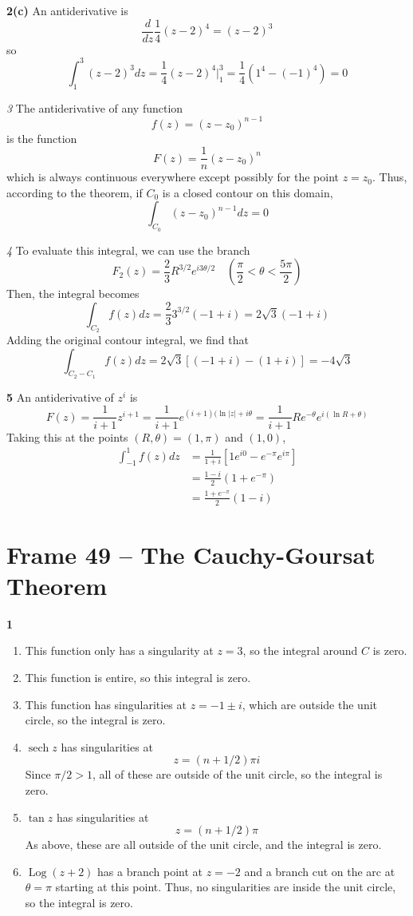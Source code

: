 \documentclass{article}
\DeclareMathOperator{\Log}{Log}
\DeclareMathOperator{\sech}{sech}
\begin{document}
\textbf{2(c)}
An antiderivative is
\[
	\frac{d}{dz} \frac{1}{4} (z - 2)^4 = (z - 2)^3
\]
so
\[
	\int_1^3 (z - 2)^3 dz 
	= \frac{1}{4} (z - 2)^4 \Big|_1^3
	= \frac{1}{4} (1^4 - (-1)^4)
	= 0
\]

\textit{3}
The antiderivative of any function
\[
	f(z) = (z - z_0)^{n-1}
\]
is the function
\[
	F(z) = \frac{1}{n} (z - z_0)^{n}
\]
which is always continuous everywhere except possibly for the point $z = z_0$. Thus, according to the theorem, if $C_0$ is a closed contour on this domain,
\[
	\int_{C_0} (z - z_0)^{n-1} dz = 0
\]

\textit{4} 
To evaluate this integral, we can use the branch
\[
	F_2(z) = \frac{2}{3} R^{3/2} e^{i3\theta/2} \quad
	\left( \frac{\pi}{2} < \theta < \frac{5\pi}{2} \right)
\]
Then, the integral becomes
\[
	\int_{C_2} f(z) dz
	= \frac{2}{3} 3^{3/2} (-1 + i)
	= 2\sqrt{3} (-1 + i)
\]
Adding the original contour integral, we find that
\[
	\int_{C_2 - C_1} f(z) dz
	= 2\sqrt{3} [(-1 + i) - (1 + i)]
	= -4\sqrt{3} 
\]

\textbf{5}
An antiderivative of $z^i$ is
\[
	F(z) = \frac{1}{i+1} z^{i+1} 
	= \frac{1}{i+1} e^{(i+1)(\ln |z| + i\theta}
	= \frac{1}{i+1} Re^{-\theta} e^{i (\ln R + \theta)} 
\]
Taking this at the points $(R, \theta) = (1, \pi)$ and $(1, 0)$,
\begin{align*}
	\int_{-1}^{1} f(z) dz
	&= \frac{1}{1+i} \left[ 1e^{i0} - e^{-\pi}e^{i\pi} \right] \\
	&= \frac{1-i}{2} (1 + e^{-\pi}) \\
	&= \frac{1 + e^{-\pi}}{2} (1 - i)
\end{align*}


\clearpage
\section{Frame 49 -- The Cauchy-Goursat Theorem}
\textbf{1}
\begin{enumerate}
	\item This function only has a singularity at $z = 3$, so the integral around $C$ is zero.
	
	\item This function is entire, so this integral is zero.
	
	\item This function has singularities at $z = -1 \pm i$, which are outside the unit circle, so the integral is zero.
	
	\item $\sech z$ has singularities at
	\[
		z = (n + 1/2) \pi i
	\]
	Since $\pi/2 > 1$, all of these are outside of the unit circle, so the integral is zero.
	
	\item $\tan z$ has singularities at
	\[
		z = (n + 1/2) \pi
	\]
	As above, these are all outside of the unit circle, and the integral is zero.
	
	\item $\Log(z + 2)$ has a branch point at $z = -2$ and a branch cut on the arc at $\theta = \pi$ starting at this point. Thus, no singularities are inside the unit circle, so the integral is zero.
\end{enumerate}
\end{document}
